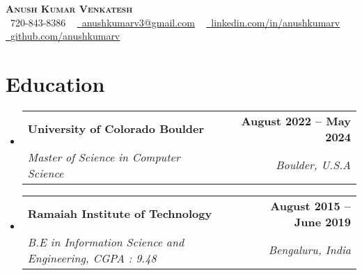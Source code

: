 \documentclass[letterpaper,11pt]{article}
\makeatletter
\newcommand{\resumeSubheading}[4]{
  \vspace{-2pt}\item
    \begin{tabular*}{1.0\textwidth}[t]{l@{\extracolsep{\fill}}r}
      \textbf{#1} & \textbf{\small #2} \\
      \textit{\small#3} & \textit{\small #4} \\
    \end{tabular*}\vspace{-7pt}
}
\newcommand{\resumeSubHeadingListStart}{\begin{itemize}[leftmargin=0.0in, label={}]}
\newcommand{\resumeSubHeadingListEnd}{\end{itemize}}
\makeatother
\begin{document}

\begin{center}
    {\Huge \scshape \textbf{Anush Kumar Venkatesh}} \\ \vspace{1pt}
    \small \raisebox{-0.1\height}\faPhone\ 720-843-8386 ~ \href{mailto:x@gmail.com}{\raisebox{-0.2\height}\faEnvelope\  \underline{anushkumarv3@gmail.com}} ~ 
    \href{https://linkedin.com/in//}{\raisebox{-0.2\height}\faLinkedin\ \underline{linkedin.com/in/anushkumarv}}  ~
    \href{https://github.com/}{\raisebox{-0.2\height}\faGithub\ \underline{github.com/anushkumarv}}
    \vspace{-8pt}
\end{center}

\section{Education}
  \resumeSubHeadingListStart
    \resumeSubheading
      {University of Colorado Boulder}{August 2022 -- May 2024}
      {Master of Science in Computer Science}{Boulder, U.S.A}
    \resumeSubheading
      {Ramaiah Institute of Technology}{August 2015 -- June 2019}
      {B.E in Information Science and Engineering, CGPA : 9.48}{Bengaluru, India}
  \resumeSubHeadingListEnd
\end{document}
